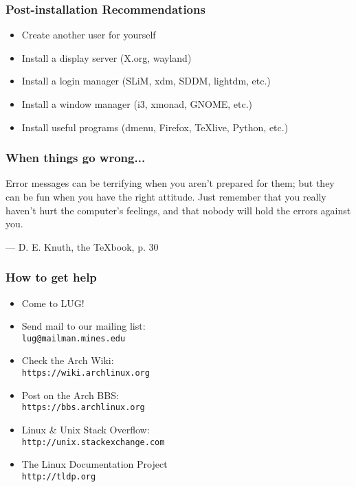 \documentclass[mathserif]{beamer}
\begin{document}
\begin{frame}
    \frametitle{Post-installation Recommendations}
    \begin{itemize}[<+->]
        \item Create another user for yourself
        \item Install a display server (X.org, wayland)
        \item Install a login manager (SLiM, xdm, SDDM, lightdm, etc.)
        \item Install a window manager (i3, xmonad, GNOME, etc.)
        \item Install useful programs (dmenu, Firefox, \TeX live, Python, etc.)
    \end{itemize}
\end{frame}

\begin{frame}
    \frametitle{When things go wrong...}
    \pause
    Error messages can be terrifying when you aren't prepared for them;
    but they can be fun when you have the right attitude. Just remember that
    you really haven't hurt the computer's feelings, and that nobody will
    hold the errors against you.

    --- D. E. Knuth, the \TeX book, p. 30
\end{frame}

\begin{frame}
    \frametitle{How to get help}
    \begin{itemize}
        \item Come to LUG!
        \item Send mail to our mailing list:\\
            \texttt{lug@mailman.mines.edu}
        \item Check the Arch Wiki:\\
            \texttt{https://wiki.archlinux.org}
        \item Post on the Arch BBS:\\
            \texttt{https://bbs.archlinux.org}
        \item Linux \& Unix Stack Overflow:\\
            \texttt{http://unix.stackexchange.com}
        \item The Linux Documentation Project\\
            \texttt{http://tldp.org}
    \end{itemize}
\end{frame}
\end{document}
